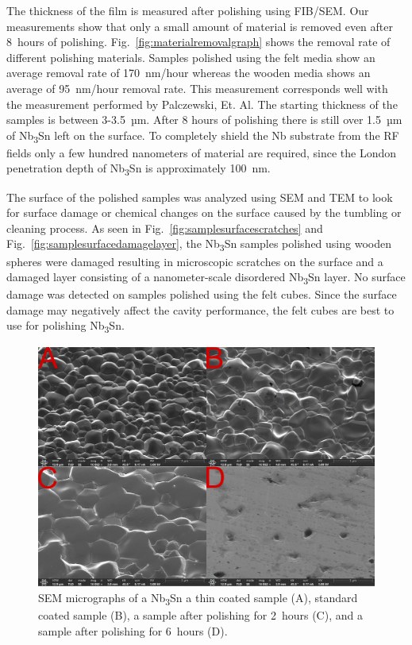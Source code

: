 \documentclass[reprint,amsmath,amssymb,aps]{revtex4-2}%
\begin{document}
The thickness of the film is measured after polishing using FIB/SEM. Our measurements show that only a small amount of material is removed even after 8~hours of polishing. Fig.~\ref{fig:materialremovalgraph} shows the removal rate of different polishing materials. Samples polished using the felt media show an average removal rate of 170~nm/hour whereas the wooden media shows an average of 95~nm/hour removal rate. This measurement corresponds well with the measurement performed by Palczewski, Et. Al.\cite{palczewski2013exploration} The starting thickness of the samples is between 3-3.5~µm. After 8 hours of polishing there is still over 1.5~µm of Nb\textsubscript{3}Sn left on the surface. To completely shield the Nb substrate from the RF fields only a few hundred nanometers of material are required, since the London penetration depth of Nb\textsubscript{3}Sn is approximately 100~nm\cite{liarte2017theoretical}.

The surface of the polished samples was analyzed using SEM and TEM to look for surface damage or chemical changes on the surface caused by the tumbling or cleaning process. As seen in Fig.~\ref{fig:samplesurfacescratches} and Fig.~\ref{fig:samplesurfacedamagelayer}, the Nb\textsubscript{3}Sn samples polished using wooden spheres were damaged resulting in microscopic scratches on the surface and a damaged layer consisting of a nanometer-scale disordered Nb\textsubscript{3}Sn layer. No surface damage was detected on samples polished using the felt cubes. Since the surface damage may negatively affect the cavity performance, the felt cubes are best to use for polishing Nb\textsubscript{3}Sn.
%




%


\begin{figure}[t]%
\centering%
\includegraphics[width=0.8\columnwidth]{../doc/figs/SEM_Images.png}%
\caption{SEM micrographs of a Nb\textsubscript{3}Sn a thin coated sample (A), standard coated sample (B), a sample after polishing for 2~hours (C), and a sample after polishing for 6~hours (D).}%
\label{fig:semimages}%
\end{figure}
\end{document}
